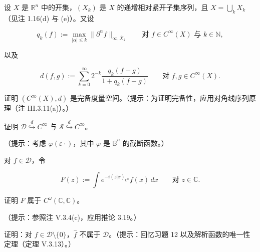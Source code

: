 \begin{exercises}
\begin{subitems}
\end{subitems}

\item

设 $ X $ 是 $ \mathbb{R}^n $ 中的开集，$ (X_k) $ 是 $ X $ 的递增相对紧开子集序列，且 $ X = \bigcup_k X_k $（见注 1.16(d) 与 (e)）。又设

\[
q_k(f) := \max_{|\alpha| \le k} \|\partial^\alpha f\|_{\infty, \overline{X}_k} \qquad \text{对 } f \in C^\infty(X) \text{ 与 } k \in \mathbb{N} ,
\]

以及

\[
d(f, g) := \sum_{k=0}^{\infty} 2^{-k} \frac{q_k(f - g)}{1 + q_k(f - g)} \qquad \text{对 } f, g \in C^\infty(X) .
\]

证明 $ (C^\infty(X), d) $ 是完备度量空间。（提示：为证明完备性，应用对角线序列原理（注 III.3.11(a)）。）

\item

证明 $ \mathcal{D} \overset{d}{\hookrightarrow} C^\infty $ 与 $ \mathcal{S} \overset{d}{\hookrightarrow} C^\infty $。

（提示：考虑 $ \varphi(\varepsilon \cdot) $，其中 $ \varphi $ 是 $ \overline{\mathbb{B}}^n $ 的截断函数。）

\item

对 $ f \in \mathcal{D} $，令

\[
F(z) := \int e^{-i(z|x)_{\mathbb{C}^n}} f(x) \, dx \qquad \text{对 } z \in \mathbb{C} .
\]

证明 $ F $ 属于 $ C^\omega(\mathbb{C}, \mathbb{C}) $。

（提示：参照注 V.3.4(c)，应用推论 3.19。）

\item

证明：对 $ f \in \mathcal{D} \setminus \{0\} $，$ \widehat{f} $ 不属于 $ \mathcal{D} $。（提示：回忆习题 12 以及解析函数的唯一性定理（定理 V.3.13）。）

\end{exercises}
